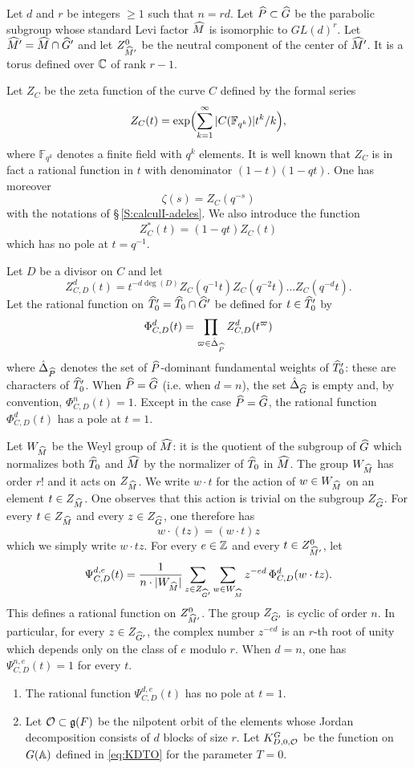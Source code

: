 \begin{paragr}
Let $d$ and $r$ be integers $\geq 1$ such that $n=rd$. Let $\widehat{P}\subset \widehat{G}$ be the parabolic subgroup whose standard Levi factor $\widehat{M}$ is isomorphic to $GL(d)^r$. Let $\widehat{M}'=\widehat{M}\cap \widehat{G}'$ and let $Z^0_{\widehat{M}'}$ be the neutral component of the center of $\widehat{M}'$. It is a torus defined over $\mathbb{C}$ of rank $r-1$.

Let $Z_C$ be the zeta function of the curve $C$ defined by the formal series
$$Z_C(t)=\exp\Bigl(\sum_{k=1}^{\infty} |C(\mathbb{F}_{q^k})|t^k/k\Bigr),$$
where $\mathbb{F}_{q^k}$ denotes a finite field with $q^k$ elements. It is well known that $Z_C$ is in fact a rational function in $t$ with denominator $(1-t)(1-qt)$. One has moreover
$$\zeta(s)=Z_C(q^{-s})$$
with the notations of \S\,\ref{S:calculI-adeles}. We also introduce the function
$$Z_C^*(t)=(1-qt)Z_C(t)$$
which has no pole at $t=q^{-1}$.

Let $D$ be a divisor on $C$ and let
$$Z^d_{C,D}(t)=t^{-d\deg(D)}Z_C(q^{-1}t)Z_C(q^{-2}t)\ldots Z_C(q^{-d}t).$$
Let the rational function on $\widehat{T}_0'=\widehat{T}_0\cap \widehat{G}'$ be defined for $t\in \widehat{T}_0'$ by
$$\Phi^d_{C,D}(t)=\prod_{\varpi\in \hat{\Delta}_{\widehat{P}}} Z^d_{C,D}(t^{\varpi})$$
where $\hat{\Delta}_{\widehat{P}}$ denotes the set of $\widehat{P}$-dominant fundamental weights of $\widehat{T}_0'$: these are characters of $\widehat{T}_0'$. When $\widehat{P}=\widehat{G}$ (i.e. when $d=n$), the set $\hat{\Delta}_{\widehat{G}}$ is empty and, by convention, $\Phi^n_{C,D}(t)=1$. Except in the case $\widehat{P}=\widehat{G}$, the rational function $\Phi^d_{C,D}(t)$ has a pole at $t=1$.

Let $W_{\widehat{M}}$ be the Weyl group of $\widehat{M}$: it is the quotient of the subgroup of $\widehat{G}$ which normalizes both $\widehat{T}_0$ and $\widehat{M}$ by the normalizer of $\widehat{T}_0$ in $\widehat{M}$. The group $W_{\widehat{M}}$ has order $r!$ and it acts on $Z_{\widehat{M}}$. We write $w\cdot t$ for the action of $w\in W_{\widehat{M}}$ on an element $t\in Z_{\widehat{M}}$. One observes that this action is trivial on the subgroup $Z_{\widehat{G}}$. For every $t\in Z_{\widehat{M}}$ and every $z\in Z_{\widehat{G}}$, one therefore has
$$w\cdot (tz)=(w\cdot t)z$$
which we simply write $w\cdot tz$. For every $e\in \mathbb{Z}$ and every $t\in Z^0_{\widehat{M}'}$, let
$$\Psi^{d,e}_{C,D}(t)=\frac{1}{n\cdot |W_{\widehat{M}}|}\sum_{z\in Z_{\widehat{G}'}}\sum_{w\in W_{\widehat{M}}} z^{-ed}\,\Phi^d_{C,D}(w\cdot tz).$$
This defines a rational function on $Z^0_{\widehat{M}'}$. The group $Z_{\widehat{G}'}$ is cyclic of order $n$. In particular, for every $z\in Z_{\widehat{G}'}$, the complex number $z^{-ed}$ is an $r$-th root of unity which depends only on the class of $e$ modulo $r$. When $d=n$, one has $\Psi^{n,e}_{C,D}(t)=1$ for every $t$.

\begin{theoreme}\label{cor:calcul}
  \begin{enumerate}
  \item The rational function $\Psi^{d,e}_{C,D}(t)$ has no pole at $t=1$.
  \item Let $\mathcal{O}\subset \mathfrak{g}(F)$ be the nilpotent orbit of the elements whose Jordan decomposition consists of $d$ blocks of size $r$. Let $K^G_{D,0,\mathcal{O}}$ be the function on $G(\mathbb{A})$ defined in \eqref{eq:KDTO} for the parameter $T=0$.


\end{enumerate}
\end{theoreme}
\end{paragr}
